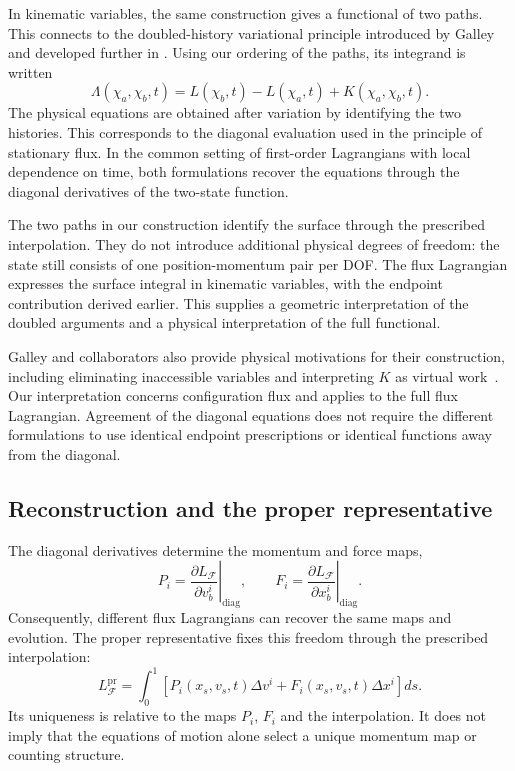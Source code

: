 \documentclass[12pt]{article}
\begin{document}
In kinematic variables, the same construction gives a functional of two paths. This connects to the doubled-history variational principle introduced by Galley~\cite{galley} and developed further in \cite{galleytsangstein,martindiego}. Using our ordering of the paths, its integrand is written
\begin{equation}
	\Lambda(\chi_a,\chi_b,t)
	=L(\chi_b,t)-L(\chi_a,t)+K(\chi_a,\chi_b,t).
\end{equation}
The physical equations are obtained after variation by identifying the two histories. This corresponds to the diagonal evaluation used in the principle of stationary flux. In the common setting of first-order Lagrangians with local dependence on time, both formulations recover the equations through the diagonal derivatives of the two-state function.

The two paths in our construction identify the surface through the prescribed interpolation. They do not introduce additional physical degrees of freedom: the state still consists of one position-momentum pair per DOF. The flux Lagrangian expresses the surface integral in kinematic variables, with the endpoint contribution derived earlier. This supplies a geometric interpretation of the doubled arguments and a physical interpretation of the full functional.

Galley and collaborators also provide physical motivations for their construction, including eliminating inaccessible variables and interpreting $K$ as virtual work~\cite{galleytsangstein}. Our interpretation concerns configuration flux and applies to the full flux Lagrangian. Agreement of the diagonal equations does not require the different formulations to use identical endpoint prescriptions or identical functions away from the diagonal.

\subsection{Reconstruction and the proper representative}

The diagonal derivatives determine the momentum and force maps,
\begin{equation}
	P_i
	=\left.\frac{\partial L_{\mathcal F}}{\partial v_b^i}
	\right|_{\mathrm{diag}},
	\qquad
	F_i
	=\left.\frac{\partial L_{\mathcal F}}{\partial x_b^i}
	\right|_{\mathrm{diag}}.
\end{equation}
Consequently, different flux Lagrangians can recover the same maps and evolution. The proper representative fixes this freedom through the prescribed interpolation:
\begin{equation}
	L_{\mathcal F}^{\mathrm{pr}}
	=\int_0^1
	\left[
	P_i(x_s,v_s,t)\Delta v^i
	+F_i(x_s,v_s,t)\Delta x^i
	\right]ds.
\end{equation}
Its uniqueness is relative to the maps $P_i$, $F_i$ and the interpolation. It does not imply that the equations of motion alone select a unique momentum map or counting structure.
\end{document}
